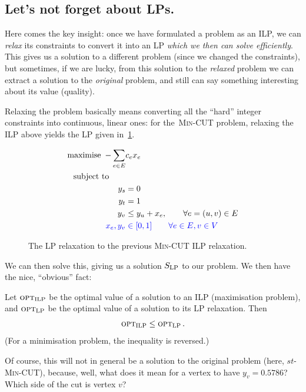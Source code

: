 \subsection{Let's not forget about LPs.} Here comes the key insight: once we have formulated a problem as an ILP, we can \emph{relax} its constraints to convert it into an LP \emph{which we then can solve efficiently}. This gives us a solution to a different problem (since we changed the constraints), but sometimes, if we are lucky, from this solution to the \emph{relaxed} problem we can extract a solution to the \emph{original} problem, and still can say something interesting about its value (quality).

Relaxing the problem basically means converting all the ``hard'' integer constraints into continuous, linear ones: \eg for the~\textsc{Min-CUT} problem, relaxing the ILP above yields the LP given in~\cref{fig:lp:relax:mincut}.
\begin{figure}[htbp]
\begin{align*}
    \operatorname{maximise}\ -\sum_{e\in E}& c_ex_e\\
    \text{subject to}\qquad&  \\
    y_s &= 0\\
    y_t &= 1\\
    y_v &\leq y_u + x_e, \qquad \forall e=(u,v)\in E\\
    \color{blue}x_e, y_v &\color{blue}\in [0,1]\qquad \forall e\in E, v\in V
\end{align*}
\caption{The LP relaxation to the previous \textsc{Min-CUT} ILP relaxation.}\label{fig:lp:relax:mincut}
\end{figure}
We can then solve this, giving us a solution $S_{\rm{} LP}$ to our problem. We then have the nice, ``obvious'' fact:
\begin{fact}
    \label{fact:lpilp}
    Let ${\textsc{opt}}_{\rm ILP}$ be the optimal value of a solution to an ILP (maximisation problem), and ${\textsc{opt}}_{\rm LP}$ be the optimal value of a solution to its LP relaxation. Then
    \[
    {\textsc{opt}}_{\rm ILP} \leq {\textsc{opt}}_{\rm LP}\,.
    \]
    (For a minimisation problem, the inequality is reversed.)
\end{fact}



Of course, this will not in general be a solution to the original problem (here, $st$-\textsc{Min-CUT}), because, well, what does it mean for a vertex to have $y_v=0.5786$? Which side of the cut is vertex $v$?

